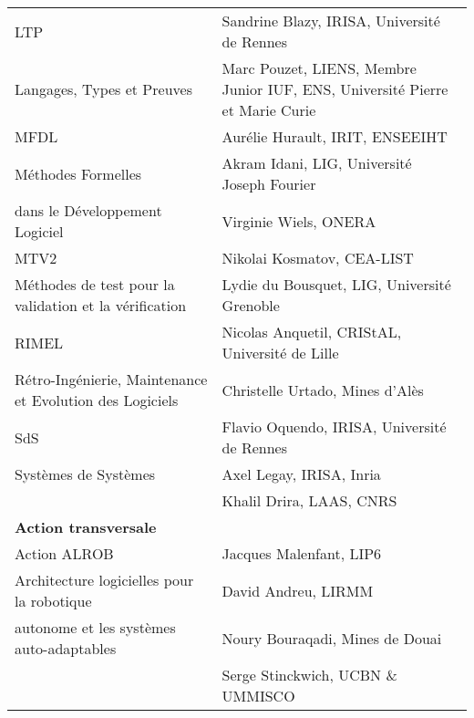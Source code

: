 \documentclass[11pt]{article}
\begin{document}
{{\begin{tabular}{|p{6cm}p{8.5cm}|}

LTP & Sandrine Blazy, IRISA, Université de Rennes\\
\footnotesize Langages, Types et Preuves 
    & Marc Pouzet,  LIENS, Membre Junior IUF, ENS, Université Pierre et Marie Curie\\
\hline

MFDL 
& Aurélie Hurault, IRIT, ENSEEIHT\\
\footnotesize  Méthodes Formelles
& Akram Idani, LIG, Université Joseph Fourier\\
\footnotesize  dans le Développement Logiciel 
& Virginie Wiels, ONERA\\
\hline

MTV2 &Nikolai Kosmatov, CEA-LIST\\
\footnotesize Méthodes de test pour la validation et la vérification  
     & Lydie du Bousquet, LIG, Université Grenoble\\
\hline

RIMEL 
& Nicolas Anquetil, CRIStAL, Université de Lille\\
\footnotesize Rétro-Ingénierie, Maintenance et Evolution des Logiciels
& Christelle Urtado, Mines d'Alès\\
\hline

SdS 
& Flavio Oquendo, IRISA, Université de Rennes\\
\footnotesize Systèmes de Systèmes
& Axel Legay, IRISA, Inria\\
& Khalil Drira, LAAS, CNRS\\

\hline 
\textbf{Action transversale}&\\
\hline 

Action ALROB & Jacques Malenfant, LIP6\\
\footnotesize
Architecture logicielles pour la robotique 
             &David Andreu, LIRMM\\
\footnotesize
autonome et les systèmes auto-adaptables
             &Noury Bouraqadi, Mines de Douai\\
             &Serge Stinckwich, UCBN \& UMMISCO\\
\hline


\end{tabular}}}
\end{document}
